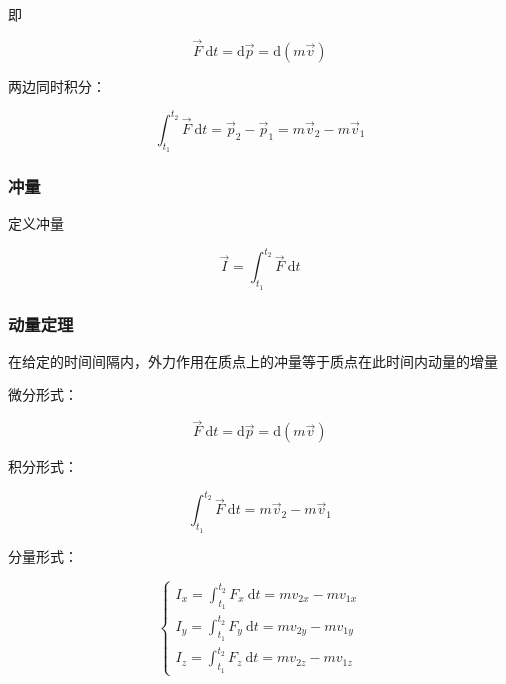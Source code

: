 \documentclass[12pt, a4paper]{article}
\numberwithin{equation}{section}
\newcommand{\rmd}{\mathrm{~d}}
\begin{document}
    即

    $$
        \overrightarrow{F} \mathrm{~d} t=\mathrm{d} \overrightarrow{p}=\mathrm{d}(m \overrightarrow{v})
    $$

    两边同时积分：

    $$
        \int_{t_1}^{t_2} \overrightarrow{F} \mathrm{~d} t=\overrightarrow{p}_2-\overrightarrow{p}_1=
        m \overrightarrow{v}_2-m \overrightarrow{v}_1
    $$

\subsubsection{冲量}

    定义冲量

    \begin{equation}
        \overrightarrow{I} = \int_{t_1}^{t_2} \overrightarrow{F} \rmd t
    \end{equation}

\subsubsection{动量定理}

    在给定的时间间隔内，外力作用在质点上的冲量等于质点在此时间内动量的增量

    微分形式：

    \begin{equation}
        \overrightarrow{F} \mathrm{~d} t=\mathrm{d} \overrightarrow{p}=\mathrm{d}(m \overrightarrow{v})
    \end{equation}

    积分形式：

    \begin{equation}
        \int_{t_1}^{t_2} \overrightarrow{F} \mathrm{~d} t = m \overrightarrow{v}_2-m \overrightarrow{v}_1
    \end{equation}

    分量形式：

    \begin{equation}
        \left\{\begin{array}{l}
        I_x=\int_{t_1}^{t_2} F_x \mathrm{~d} t=m v_{2 x}-m v_{1 x} \\
        I_y=\int_{t_1}^{t_2} F_y \mathrm{~d} t=m v_{2 y}-m v_{1 y} \\
        I_z=\int_{t_1}^{t_2} F_z \mathrm{~d} t=m v_{2 z}-m v_{1 z}
        \end{array}\right.
    \end{equation}
\end{document}
